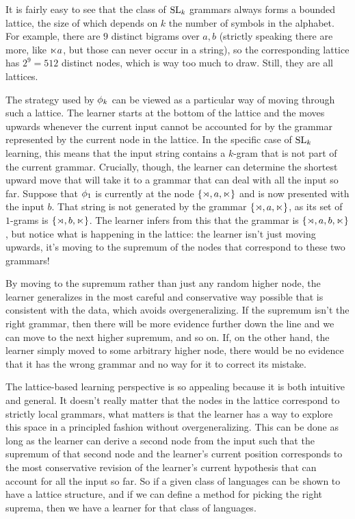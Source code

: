 It is fairly easy to see that the class of $\mathrm{SL}_k$ grammars always forms a bounded lattice, the size of which depends on $k$ the number of symbols in the alphabet.
For example, there are $9$ distinct bigrams over $a,b$ (strictly speaking there are more, like $\ltimes a$, but those can never occur in a string), so the corresponding lattice has $2^9 = 512$ distinct nodes, which is way too much to draw.
Still, they are all lattices.

The strategy used by $\phi_k$ can be viewed as a particular way of moving through such a lattice.
The learner starts at the bottom of the lattice and the moves upwards whenever the current input cannot be accounted for by the grammar represented by the current node in the lattice.
In the specific case of $\mathrm{SL}_k$ learning, this means that the input string contains a $k$-gram that is not part of the current grammar.
Crucially, though, the learner can determine the shortest upward move that will take it to a grammar that can deal with all the input so far.
Suppose that $\phi_1$ is currently at the node $\left \{ \rtimes, a, \ltimes \right \}$ and is now presented with the input $b$.
That string is not generated by the grammar $\left \{ \rtimes, a, \ltimes \right \}$, as its set of $1$-grams is $\left \{ \rtimes, b, \ltimes \right \}$.
The learner infers from this that the grammar is $\left \{ \rtimes, a, b, \ltimes \right \}$, but notice what is happening in the lattice:
the learner isn't just moving upwards, it's moving to the supremum of the nodes that correspond to these two grammars!

By moving to the supremum rather than just any random higher node, the learner generalizes in the most careful and conservative way possible that is consistent with the data, which avoids overgeneralizing.
If the supremum isn't the right grammar, then there will be more evidence further down the line and we can move to the next higher supremum, and so on.
If, on the other hand, the learner simply moved to some arbitrary higher node, there would be no evidence that it has the wrong grammar and no way for it to correct its mistake.

The lattice-based learning perspective is so appealing because it is both intuitive and general.
It doesn't really matter that the nodes in the lattice correspond to strictly local grammars, what matters is that the learner has a way to explore this space in a principled fashion without overgeneralizing.
This can be done as long as the learner can derive a second node from the input such that the supremum of that second node and the learner's current position corresponds to the most conservative revision of the learner's current hypothesis that can account for all the input so far.
So if a given class of languages can be shown to have a lattice structure, and if we can define a method for picking the right suprema, then we have a learner for that class of languages.

